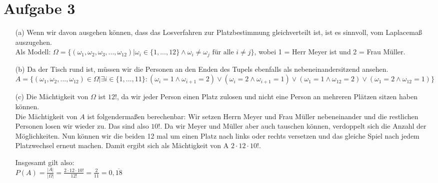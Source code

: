 \documentclass[10pt,a4paper]{article}
\begin{document}
\section*{Aufgabe 3}
\begin{itemize}
\item[(a)] Wenn wir davon ausgehen können, dass das Losverfahren zur Platzbestimmung gleichverteilt ist, ist es sinnvoll, vom Laplacemaß auszugehen.\\
Als Modell: $ \Omega = \{ (\omega_{1},\omega_{2}, \omega_{3}, ..., \omega_{12}) | \omega_{i} \in\{1,...,12\} \wedge \omega_{i} \neq \omega_{j} \text{ für alle } i \neq j \} $, wobei 1 = Herr Meyer ist und 2 = Frau Müller.

\item[(b)]
Da der Tisch rund ist, müssen wir die Personen an den Enden des Tupels ebenfalls als nebeneinandersitzend ansehen.\\
$A = \{(\omega_1, \omega_2, ..., \omega_{12}) \in \Omega | \exists i \in \{1, ...,11\} : (\omega_i = 1 \wedge \omega_{i+1} = 2) \vee (\omega_i = 2 \wedge \omega_{i+1} = 1) \vee (\omega_1 = 1 \wedge \omega_{12} = 2) \vee (\omega_1 = 2 \wedge \omega_{12} = 1) \}$

\item[(c)]
Die Mächtigkeit von $\Omega$ ist $12!$, da wir jeder Person einen Platz zulosen und nicht eine Person an mehreren Plätzen sitzen haben können.\\
Die Mächtigkeit von $A$ ist folgendermaßen berechenbar: Wir setzen Herrn Meyer und Frau Müller nebeneinander und die restlichen Personen losen wir wieder zu. Das sind also $10!$. Da wir Meyer und Müller aber auch tauschen können, verdoppelt sich die Anzahl der Möglichkeiten. Nun können wir die beiden 12 mal um einen Platz nach links oder rechts versetzen und das gleiche Spiel nach jedem Platzwechsel erneut machen. Damit ergibt sich als Mächtigkeit von A $2 \cdot 12 \cdot 10!$.

Insgesamt gilt also:\\
$P(A) = \frac{|A|}{|\Omega|} = \frac{2 \cdot 12 \cdot 10!}{12!} = \frac{2}{11} = 0,\overline{18}$

\end{itemize}
\end{document}
